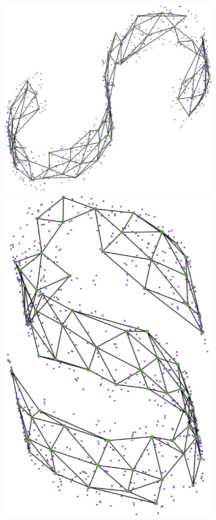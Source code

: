 \documentclass[
  12pt]{article}
\begin{document}
\begin{figure}[H]
\begin{minipage}{0.25\linewidth}
\includegraphics{figures/scurve/sc_umap_best_1.png}\end{minipage}%
%
\begin{minipage}{0.25\linewidth}
\includegraphics{figures/scurve/sc_umap_best_2.png}\end{minipage}%

\end{figure}
\end{document}
